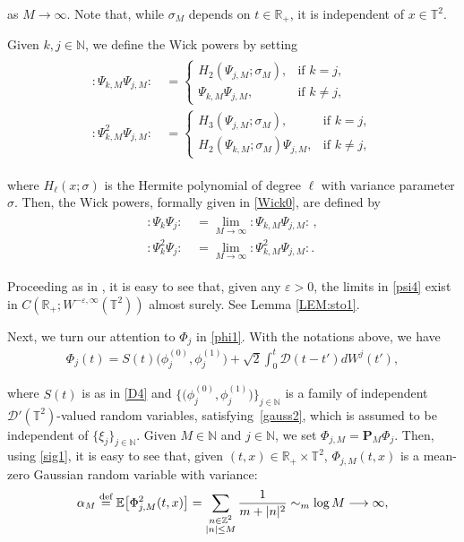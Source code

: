 \documentclass[letterpaper, 11pt,  reqno]{amsart}
\newcommand{\1}{\hspace{0.5mm}\text{I}\hspace{0.2mm}}
\newcommand{\noi}{\noindent}
\newcommand{\R}{\mathbb{R}}
\newcommand{\T}{\mathbb{T}}
\newcommand{\Z}{\mathbb{Z}}
\newcommand{\N}{\mathbb{N}}
\newcommand{\E}{\mathbb{E}}
\newcommand{\D}{\mathcal{D}}
\newcommand{\al}{\alpha}
\newcommand{\eps}{\varepsilon}
\renewcommand{\P}{\mathbf{P}}
\newcommand{\wick}[1]{:\!{#1}\!:}
\newcommand{\deff}{\stackrel{\textup{def}}{=}}
\newcommand{\too}{\longrightarrow}
\renewcommand{\l}{\ell}
\numberwithin{equation}{section}
\numberwithin{theorem}{section}
\begin{document}
\noi
 as $M \to \infty$.
Note that, 
while  $\sigma_M$ depends on $t\in \R_+$, 
it is independent of $x \in \T^2$.
 
Given $k, j \in \N$, we define
the Wick powers by setting
\begin{align}
\begin{split}
\wick{ \Psi_{k, M} \Psi_{j, M} } \, 
& = 
\begin{cases}
        H_2 ( \Psi_{j, M}; \sigma_M ), &  \text{if } k = j,  \\
\Psi_{k, M} \Psi_{j, M}, & \text{if } k \neq j,
    \end{cases} \\
\wick{ \Psi_{k, M}^2 \Psi_{j, M} } \, 
& = 
\begin{cases}
H_3 ( \Psi_{j, M}; \sigma_M ),  & \text{if } k = j,  \\
H_2 ( \Psi_{k, M}; \sigma_M ) \Psi_{j, M},  & \text{if } k \neq j,
\end{cases}
\end{split}
\label{psi3}
\end{align}

\noi
where $H_\l (x ; \sigma)$ is the  Hermite polynomial of degree $\l$ with variance parameter $\sigma$. Then, the Wick powers,  formally given in \eqref{Wick0}, 
are defined by 
\begin{align}
\begin{split}
    \wick{\Psi_k \Psi_j} \, &=  \lim_{M \to \infty} \wick{\Psi_{k,M} \Psi_{j,M}} \, , \\
    \wick{\Psi_k^2 \Psi_j} \, &=  \lim_{M \to \infty} \wick{\Psi_{k,M}^2 \Psi_{j,M}}.
\end{split}
\label{psi4}
\end{align}

\noi
Proceeding as in \cite{GKO, GKO2}, 
it is easy to see that, given any $\eps > 0$,  the limits in \eqref{psi4}
exist
in $C(\R_+; W^{-\eps, \infty}(\T^2))$
almost surely.
See Lemma \ref{LEM:sto1}.

Next, we turn our attention to  $\Phi_j$  in \eqref{phi1}.
With the notations above, we have 
\begin{align}
\Phi_j (t) = 
S(t) \big(\phi^{(0)}_j, \phi^{(1)}_j\big) + \sqrt {2} \int_0^t \D (t - t') d W^j (t'), 
\label{phi2}
\end{align}

\noi
where 
$S(t)$ is as in \eqref{D4} and $\big\{\big(\phi^{(0)}_j, \phi^{(1)}_j\big)\big\}_{j \in \N}$
is a family of independent $\D'(\T^2)$-valued random variables, satisfying~\eqref{gauss2}, 
which is assumed to be independent of $\{\xi_j\}_{j \in \N}$.
Given $M \in \N$ and $j \in \N$, we set  $\Phi_{j, M} = \P_{M} \Phi_j$. 
Then, 
using \eqref{sig1}, 
it is easy to see that, 
given $(t, x) \in \R_+ \times \T^2$, 
$\Phi_{j, M}(t, x)$ is a mean-zero Gaussian random variable with variance:
\begin{align*}
    \al_M \deff \E \big[ \Phi^2_{j, M} (t, x)\big] = \sum_{\substack{n \in \Z^2 \\ |n| \leq M}} \frac{1}{m + |n|^2} \sim_m \log M
\too \infty,
\end{align*}
\end{document}
